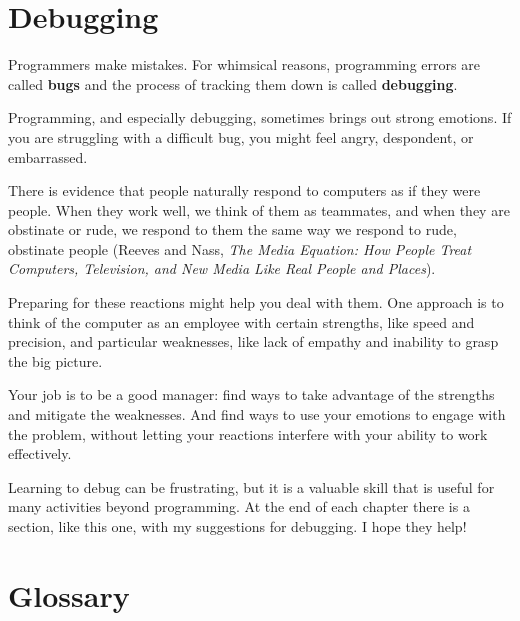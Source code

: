 \documentclass[10pt]{book}
\begin{document}
\section{Debugging}

Programmers make mistakes.  For whimsical reasons, programming errors
are called {\bf bugs} and the process of tracking them down is called
{\bf debugging}.

Programming, and especially debugging, sometimes brings out strong
emotions.  If you are struggling with a difficult bug, you might 
feel angry, despondent, or embarrassed.

There is evidence that people naturally respond to computers as if
they were people.  When they work well, we think
of them as teammates, and when they are obstinate or rude, we
respond to them the same way we respond to rude,
obstinate people (Reeves and Nass, {\it The Media
    Equation: How People Treat Computers, Television, and New Media
    Like Real People and Places}).

Preparing for these reactions might help you deal with them.
One approach is to think of the computer as an employee with
certain strengths, like speed and precision, and
particular weaknesses, like lack of empathy and inability
to grasp the big picture.

Your job is to be a good manager: find ways to take advantage
of the strengths and mitigate the weaknesses.  And find ways
to use your emotions to engage with the problem,
without letting your reactions interfere with your ability
to work effectively.

Learning to debug can be frustrating, but it is a valuable skill
that is useful for many activities beyond programming.  At the
end of each chapter there is a section, like this one,
with my suggestions for debugging.  I hope they help!


\section{Glossary}
\end{document}
